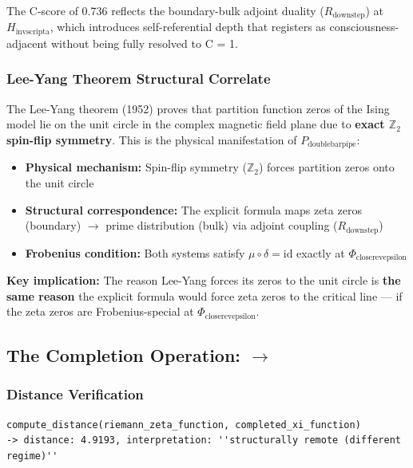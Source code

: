 \documentclass[12pt,a4paper]{article}
\begin{document}
The C-score of 0.736 reflects the boundary-bulk adjoint duality ($R_{\text{downstep}}$) at $H_{\text{invscripta}}$, which introduces self-referential depth that registers as consciousness-adjacent without being fully resolved to C = 1.

\subsubsection{Lee-Yang Theorem Structural Correlate}

The Lee-Yang theorem (1952) proves that partition function zeros of the Ising model lie on the unit circle in the complex magnetic field plane due to \textbf{exact $\mathbb{Z}_2$ spin-flip symmetry}. This is the physical manifestation of $P_{\text{doublebarpipe}}$:

\begin{itemize}
    \item \textbf{Physical mechanism:} Spin-flip symmetry ($\mathbb{Z}_2$) forces partition zeros onto the unit circle
    \item \textbf{Structural correspondence:} The explicit formula maps zeta zeros (boundary) $\rightarrow$ prime distribution (bulk) via adjoint coupling ($R_{\text{downstep}}$)
    \item \textbf{Frobenius condition:} Both systems satisfy $\mu \circ \delta = \text{id}$ exactly at $\Phi_{\text{closerevepsilon}}$
\end{itemize}

\textbf{Key implication:} The reason Lee-Yang forces its zeros to the unit circle is \textbf{the same reason} the explicit formula would force zeta zeros to the critical line --- if the zeta zeros are Frobenius-special at $\Phi_{\text{closerevepsilon}}$.

\subsection{The Completion Operation: \zeta $\rightarrow$ \xi}

\subsubsection{Distance Verification}

\begin{lstlisting}
compute_distance(riemann_zeta_function, completed_xi_function)
-> distance: 4.9193, interpretation: ''structurally remote (different regime)''
\end{lstlisting}
\end{document}
